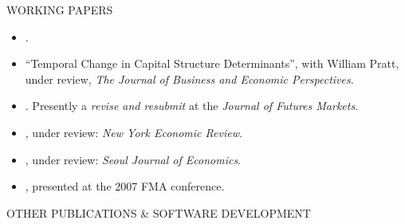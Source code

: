 \documentclass[9pt]{article}
\begin{document}
\vspace{10pt}
WORKING PAPERS
\begin{itemize}[noitemsep, nolistsep]
\item \href{https://papers.ssrn.com/sol3/papers.cfm?abstract_id=3125788}{\color{Blue}{Trade Intensity and Liquidity}}.
\item ``Temporal Change in Capital Structure Determinants'', with William Pratt, under review, {\it The Journal of Business and Economic Perspectives}.
\item \href{https://papers.ssrn.com/sol3/papers.cfm?abstract_id=2848527}{\color{Blue}{High-Frequency Trading and Market Efficiency: Evidence from the Weekly Natural Gas Storage Report}}.  Presently a {\it revise and resubmit} at the {\it Journal of Futures Markets}.
\item \href{http://ssrn.com/abstract=2371753}{\color{Blue}{State Dependence in the Natural Gas and Rig Count Relationship}}, under review: {\it New York Economic Review}.
\item \href{http://complete-markets.com/wp-content/uploads/2014/07/Performance_measures_June_2014.pdf}{\color{Blue}{How Consistent are the Judges of Portfolio Performance?}}, under review: {\it Seoul Journal of Economics}.
\item \href{https://docs.google.com/file/d/0B46EsGCAlLnPdmxsT3ZtVGk5Wkk/edit?usp=sharing}{\color{Blue}{Almost Stochastic Dominance: A Penchant for Risk}}, presented at the 2007 FMA conference.
\end{itemize}
\vspace{10pt}
OTHER PUBLICATIONS \& SOFTWARE DEVELOPMENT
\end{document}
